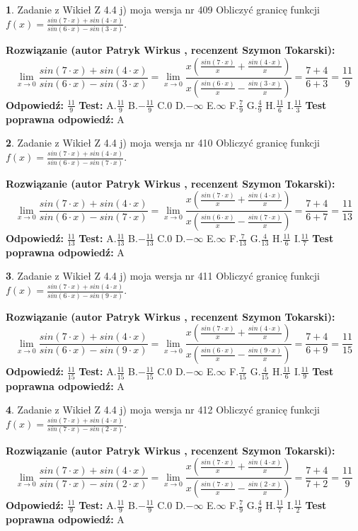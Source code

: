 \documentclass[12pt, a4paper]{article}
\theoremstyle{definition} %
\newtheorem{zad}{}
\newcommand{\zadStart}[1]{\begin{zad}#1\newline}
\newcommand{\zadStop}{\end{zad}}
\newcommand{\rozwStart}[2]{\noindent \textbf{Rozwiązanie (autor #1 , recenzent #2): }\newline}
\newcommand{\rozwStop}{\newline}
\newcommand{\odpStart}{\noindent \textbf{Odpowiedź:}\newline}
\newcommand{\odpStop}{\newline}
\newcommand{\testStart}{\noindent \textbf{Test:}\newline}
\newcommand{\testStop}{\newline}
\newcommand{\kluczStart}{\noindent \textbf{Test poprawna odpowiedź:}\newline}
\newcommand{\kluczStop}{\newline}
\begin{document}
\zadStart{Zadanie z Wikieł Z 4.4 j) moja wersja nr 409}
Obliczyć granicę funkcji $f(x)=\frac{sin(7\cdot x) +sin(4\cdot x)}{sin(6\cdot x) -sin(3\cdot x)}$.
\zadStop
\rozwStart{Patryk Wirkus}{Szymon Tokarski}
$$\lim\limits_{x\to 0}\frac{sin(7\cdot x) +sin(4\cdot x)}{sin(6\cdot x) -sin(3\cdot x)}=\lim\limits_{x\to 0}\frac{x(\frac{sin(7\cdot x)}{x}+\frac{sin(4\cdot x)}{x})}{x(\frac{sin(6\cdot x)}{x}-\frac{sin(3\cdot x)}{x})}=\frac{7+4}{6+3} = \frac{11}{9}$$
\rozwStop
\odpStart
$\frac{11}{9}$
\odpStop
\testStart
A.$\frac{11}{9}$
B.$-\frac{11}{9}$
C.$0$
D.$-\infty$
E.$\infty$
F.$\frac{7}{9}$
G.$\frac{4}{9}$
H.$\frac{11}{6}$
I.$\frac{11}{3}$
\testStop
\kluczStart
A
\kluczStop



\zadStart{Zadanie z Wikieł Z 4.4 j) moja wersja nr 410}
Obliczyć granicę funkcji $f(x)=\frac{sin(7\cdot x) +sin(4\cdot x)}{sin(6\cdot x) -sin(7\cdot x)}$.
\zadStop
\rozwStart{Patryk Wirkus}{Szymon Tokarski}
$$\lim\limits_{x\to 0}\frac{sin(7\cdot x) +sin(4\cdot x)}{sin(6\cdot x) -sin(7\cdot x)}=\lim\limits_{x\to 0}\frac{x(\frac{sin(7\cdot x)}{x}+\frac{sin(4\cdot x)}{x})}{x(\frac{sin(6\cdot x)}{x}-\frac{sin(7\cdot x)}{x})}=\frac{7+4}{6+7} = \frac{11}{13}$$
\rozwStop
\odpStart
$\frac{11}{13}$
\odpStop
\testStart
A.$\frac{11}{13}$
B.$-\frac{11}{13}$
C.$0$
D.$-\infty$
E.$\infty$
F.$\frac{7}{13}$
G.$\frac{4}{13}$
H.$\frac{11}{6}$
I.$\frac{11}{7}$
\testStop
\kluczStart
A
\kluczStop



\zadStart{Zadanie z Wikieł Z 4.4 j) moja wersja nr 411}
Obliczyć granicę funkcji $f(x)=\frac{sin(7\cdot x) +sin(4\cdot x)}{sin(6\cdot x) -sin(9\cdot x)}$.
\zadStop
\rozwStart{Patryk Wirkus}{Szymon Tokarski}
$$\lim\limits_{x\to 0}\frac{sin(7\cdot x) +sin(4\cdot x)}{sin(6\cdot x) -sin(9\cdot x)}=\lim\limits_{x\to 0}\frac{x(\frac{sin(7\cdot x)}{x}+\frac{sin(4\cdot x)}{x})}{x(\frac{sin(6\cdot x)}{x}-\frac{sin(9\cdot x)}{x})}=\frac{7+4}{6+9} = \frac{11}{15}$$
\rozwStop
\odpStart
$\frac{11}{15}$
\odpStop
\testStart
A.$\frac{11}{15}$
B.$-\frac{11}{15}$
C.$0$
D.$-\infty$
E.$\infty$
F.$\frac{7}{15}$
G.$\frac{4}{15}$
H.$\frac{11}{6}$
I.$\frac{11}{9}$
\testStop
\kluczStart
A
\kluczStop



\zadStart{Zadanie z Wikieł Z 4.4 j) moja wersja nr 412}
Obliczyć granicę funkcji $f(x)=\frac{sin(7\cdot x) +sin(4\cdot x)}{sin(7\cdot x) -sin(2\cdot x)}$.
\zadStop
\rozwStart{Patryk Wirkus}{Szymon Tokarski}
$$\lim\limits_{x\to 0}\frac{sin(7\cdot x) +sin(4\cdot x)}{sin(7\cdot x) -sin(2\cdot x)}=\lim\limits_{x\to 0}\frac{x(\frac{sin(7\cdot x)}{x}+\frac{sin(4\cdot x)}{x})}{x(\frac{sin(7\cdot x)}{x}-\frac{sin(2\cdot x)}{x})}=\frac{7+4}{7+2} = \frac{11}{9}$$
\rozwStop
\odpStart
$\frac{11}{9}$
\odpStop
\testStart
A.$\frac{11}{9}$
B.$-\frac{11}{9}$
C.$0$
D.$-\infty$
E.$\infty$
F.$\frac{7}{9}$
G.$\frac{4}{9}$
H.$\frac{11}{7}$
I.$\frac{11}{2}$
\testStop
\kluczStart
A
\kluczStop
\end{document}
